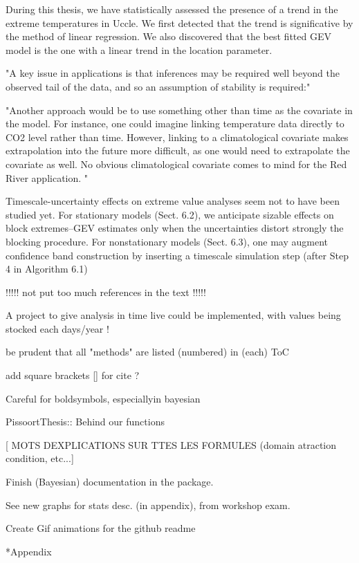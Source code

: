\documentclass[11pt,a4paper,openany, twosided]{book}
\makeatletter
\renewcommand\part{%
	\if@openright
	\cleardoublepage
	\else
	\clearpage
	\fi
	\thispagestyle{empty}%
	\if@twocolumn
	\onecolumn
	\@tempswatrue
	\else
	\@tempswafalse
	\fi
	\null\vfil
	\secdef\@part\@spart}
\let\origappendix\appendix %
\renewcommand\appendix{\clearpage\pagenumbering{Roman}\origappendix}
\makeatother
\begin{document}
During this thesis, we have statistically assessed the presence of a trend in the extreme temperatures in Uccle. We first detected that the trend is significative by the method of linear regression. We also discovered that the best fitted GEV model is the one with a linear trend in the location parameter.

"A key issue in applications is that inferences
may be required well beyond the observed tail of
the data, and so an assumption of stability is required:" \cite{davison_statistical_2012}

"Another approach would be to use something other than time as the covariate 
in the model. For instance, one could imagine linking temperature data directly to
CO2 level rather than time. However, linking to a climatological covariate makes
extrapolation into the future more difficult, as one would need to extrapolate the 
covariate as well. No obvious climatological covariate comes to mind for the Red
River application. " %


Timescale-uncertainty effects on extreme value analyses seem not to have been
studied yet. For stationary models (Sect. 6.2), we anticipate sizable effects on block
extremes–GEV estimates only when the uncertainties distort strongly the blocking
procedure. For nonstationary models (Sect. 6.3), one may augment confidence band
construction by inserting a timescale simulation step (after Step 4 in Algorithm 6.1) \citet[pp.262]{mudelsee_climate_2014}


!!!!! not put too much references in the text !!!!!

A project to give analysis in time live could be implemented, with values being stocked each days/year !

be prudent that all "methods" are listed (numbered) in (each) ToC

add square brackets [] for cite ? 

Careful for boldsymbols, especiallyin bayesian

PissoortThesis:: Behind our functions 

[ MOTS DEXPLICATIONS SUR TTES LES FORMULES (domain atraction condition, etc...]

\thispagestyle{empty}

Finish (Bayesian) documentation in the package.

See new graphs for stats desc. (in appendix), from workshop exam.

Create Gif animations for the github readme


{}
\part*{Appendix}
\appendix







\setlength{\parindent}{5em}
\setlength{\parskip}{2em}
\renewcommand{\baselinestretch}{4.0}


\end{document}
